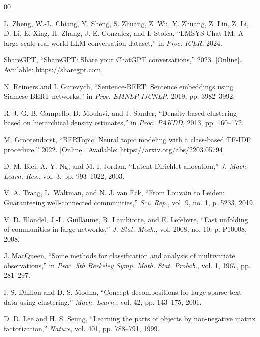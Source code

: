 \documentclass[conference]{IEEEtran}
\begin{document}
\begin{thebibliography}{00}

L. Zheng, W.-L. Chiang, Y. Sheng, S. Zhuang, Z. Wu, Y. Zhuang, Z. Lin, Z. Li, D. Li, E. Xing, H. Zhang, J. E. Gonzalez, and I. Stoica, ``LMSYS-Chat-1M: A large-scale real-world LLM conversation dataset,'' in \textit{Proc. ICLR}, 2024.

ShareGPT, ``ShareGPT: Share your ChatGPT conversations,'' 2023. [Online]. Available: \url{https://sharegpt.com}

N. Reimers and I. Gurevych, ``Sentence-BERT: Sentence embeddings using Siamese BERT-networks,'' in \textit{Proc. EMNLP-IJCNLP}, 2019, pp. 3982--3992.

R. J. G. B. Campello, D. Moulavi, and J. Sander, ``Density-based clustering based on hierarchical density estimates,'' in \textit{Proc. PAKDD}, 2013, pp. 160--172.

M. Grootendorst, ``BERTopic: Neural topic modeling with a class-based TF-IDF procedure,'' 2022. [Online]. Available: \url{https://arxiv.org/abs/2203.05794}

D. M. Blei, A. Y. Ng, and M. I. Jordan, ``Latent Dirichlet allocation,'' \textit{J. Mach. Learn. Res.}, vol. 3, pp. 993--1022, 2003.

V. A. Traag, L. Waltman, and N. J. van Eck, ``From Louvain to Leiden: Guaranteeing well-connected communities,'' \textit{Sci. Rep.}, vol. 9, no. 1, p. 5233, 2019.

V. D. Blondel, J.-L. Guillaume, R. Lambiotte, and E. Lefebvre, ``Fast unfolding of communities in large networks,'' \textit{J. Stat. Mech.}, vol. 2008, no. 10, p. P10008, 2008.

J. MacQueen, ``Some methods for classification and analysis of multivariate observations,'' in \textit{Proc. 5th Berkeley Symp. Math. Stat. Probab.}, vol. 1, 1967, pp. 281--297.

I. S. Dhillon and D. S. Modha, ``Concept decompositions for large sparse text data using clustering,'' \textit{Mach. Learn.}, vol. 42, pp. 143--175, 2001.

D. D. Lee and H. S. Seung, ``Learning the parts of objects by non-negative matrix factorization,'' \textit{Nature}, vol. 401, pp. 788--791, 1999.


\end{thebibliography}
\end{document}
